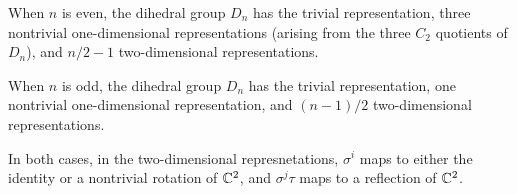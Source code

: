 \begin{prop}\label{prop:dnchartable}

  When $n$ is even, the dihedral group $D_n$ has the trivial representation,
three nontrivial one-dimensional representations (arising from the three $C_2$
quotients of $D_n$), and $n/2 - 1$ two-dimensional representations.

  When $n$ is odd, the dihedral group $D_n$ has the trivial representation, one
nontrivial one-dimensional representation, and $(n - 1)/2$ two-dimensional
representations.

  In both cases, in the two-dimensional represnetations, $\sigma^i$ maps to
either the identity or a nontrivial rotation of $\mathbb{C}^2$, and $\sigma^j\tau$ maps
to a reflection of $\mathbb{C}^2$.
\end{prop}
